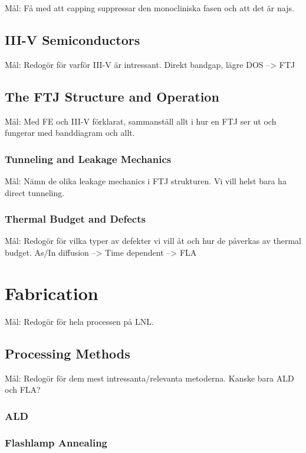 \documentclass[11pt,twoside]{eitExjobb}
\begin{document}
Mål: Få med att capping suppressar den monocliniska fasen och att det är najs.

\section{III-V Semiconductors}

Mål: Redogör för varför III-V är intressant. Direkt bandgap, lägre DOS --> FTJ

\section{The FTJ Structure and Operation}

Mål: Med FE och III-V förklarat, sammanställ allt i hur en FTJ ser ut och
fungerar med banddiagram och allt.

\subsection{Tunneling and Leakage Mechanics}

Mål: Nämn de olika leakage mechanics i FTJ strukturen. Vi vill helst bara ha
direct tunneling.

\subsection{Thermal Budget and Defects}

Mål: Redogör för vilka typer av defekter vi vill åt och hur de påverkas av
thermal budget. As/In diffusion --> Time dependent --> FLA

\chapter{Fabrication}\label{ch:fab}

Mål: Redogör för hela processen på LNL.\ 

\section{Processing Methods}

Mål: Redogör för dem mest intressanta/relevanta metoderna. Kanske bara ALD och FLA?\ 

\subsection{ALD}

\subsection{Flashlamp Annealing}
\end{document}

